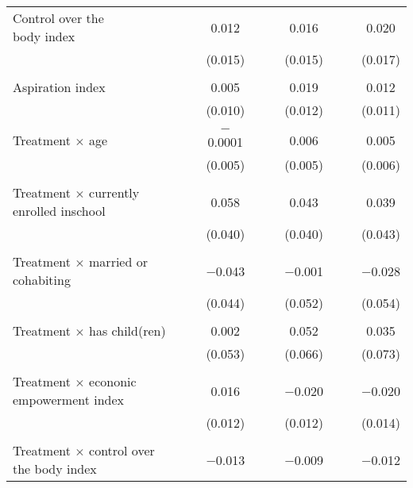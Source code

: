 \documentclass{report}
\begin{document}
\begin{table}[!htbp]
\begin{tabular}{@{\extracolsep{5pt}}lccccccccc}
 \makecell[l]{Control over the\\\hspace{1em}body index} &  &  & 0.012 &  &  & 0.016 &  &  & 0.020 \\ 
  &  &  & (0.015) &  &  & (0.015) &  &  & (0.017) \\ 
  & & & & & & & & & \\ 
 Aspiration index &  &  & 0.005 &  &  & 0.019 &  &  & 0.012 \\ 
  &  &  & (0.010) &  &  & (0.012) &  &  & (0.011) \\ 
  & & & & & & & & & \\ 
 Treatment $\times$ age &  &  & $-$0.0001 &  &  & 0.006 &  &  & 0.005 \\ 
  &  &  & (0.005) &  &  & (0.005) &  &  & (0.006) \\ 
  & & & & & & & & & \\ 
 \makecell[l]{Treatment $\times$ currently\\\hspace{1em}enrolled inschool} &  &  & 0.058 &  &  & 0.043 &  &  & 0.039 \\ 
  &  &  & (0.040) &  &  & (0.040) &  &  & (0.043) \\ 
  & & & & & & & & & \\ 
 \makecell[l]{Treatment $\times$ married\\\hspace{1em}or cohabiting} &  &  & $-$0.043 &  &  & $-$0.001 &  &  & $-$0.028 \\ 
  &  &  & (0.044) &  &  & (0.052) &  &  & (0.054) \\ 
  & & & & & & & & & \\ 
 \makecell[l]{Treatment $\times$ has\\\hspace{1em}child(ren)} &  &  & 0.002 &  &  & 0.052 &  &  & 0.035 \\ 
  &  &  & (0.053) &  &  & (0.066) &  &  & (0.073) \\ 
  & & & & & & & & & \\ 
 \makecell[l]{Treatment $\times$ econonic\\\hspace{1em}empowerment index} &  &  & 0.016 &  &  & $-$0.020 &  &  & $-$0.020 \\ 
  &  &  & (0.012) &  &  & (0.012) &  &  & (0.014) \\ 
  & & & & & & & & & \\ 
 \makecell[l]{Treatment $\times$ control\\\hspace{1em}over the body index} &  &  & $-$0.013 &  &  & $-$0.009 &  &  & $-$0.012 \\ 

\end{tabular}
\end{table}
\end{document}
